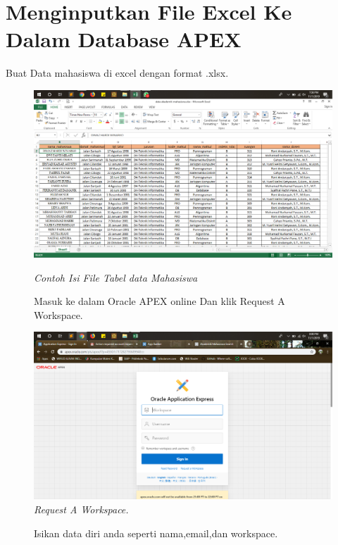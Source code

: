 \chapter{Menginputkan File Excel Ke Dalam Database APEX}

\begin{enumerate}
\item[1]Buat Data mahasiswa di excel dengan format .xlsx.
    \begin{figure}[!htbp]
    \begin{center}
    \includegraphics[scale=0.2]{figures/g0.png}
    \caption{\textit{Contoh Isi File Tabel data Mahasiswa}}
    \end{center}   
\item[2]Masuk ke dalam Oracle APEX online Dan klik Request A Workspace.

    \begin{center}
    \includegraphics[scale=0.2]{figures/g1.1.png}
    \caption{\textit{Request A Workspace.}}
    \end{center}
    \end{figure}
\begin{figure}[!htbp]
\item[3]Isikan data diri anda seperti nama,email,dan workspace.


\end{figure}
\end{enumerate}
